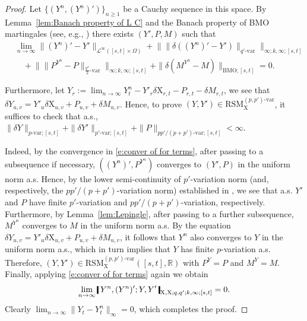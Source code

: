 \documentclass[11pt,reqno]{amsart}
\numberwithin{equation}{section}
\def\R{\mathbb R}
\newcommand{\shortthickbar}{%
  \vcenter{\hbox{\rule{1.8pt}{2.2ex}}}%
}
\newcommand{\thicknm}[1]{%
  \mathopen{\shortthickbar}%
  \mkern4mu #1 \mkern4mu%
  \mathclose{\shortthickbar}%
}
\begin{document}
\begin{proof}
Let $\{(Y^n,(Y^n)')\}_{n \ge 1}$ be a Cauchy sequence in this space. By Lemma~\ref{lem:Banach property of L C} and the Banach property of \textrm{BMO} martingales (see, e.g., \cite[Chapter~2.1]{Kazamaki1994}) there exists $(Y',P,M)$ such that 
\begin{equation}\label{e:conver of for terms}
\begin{aligned}
&\lim_{n\to\infty} \|(Y^n)' - Y'\|_{\mathcal L^{\infty}([s,t] \times \Omega)} + \big\| \|\delta ((Y^n)' - Y')\|_{q'\text{-}\mathrm{var}} \big\|_{\infty;k,\infty;[s,t]} \\
&\quad + \big\| \|P^{Y^n} - P\|_{\frac{q''}{2}\text{-}\mathrm{var}} \big\|_{\infty;k,\infty;[s,t]} + \|\delta(M^{Y^n} - M)\|_{\mathrm{BMO};[s,t]} = 0.
\end{aligned}
\end{equation}

Furthermore, let $Y_r := \lim_{n \to \infty} Y^n_{t} - Y'_r \delta \mathrm X_{r,t} - P_{r,t} - \delta M_{r,t}$, we see that $\delta Y_{u,v} = Y'_{u} \delta \mathrm X_{u,v} + P_{u,v} + \delta M_{u,v}$. Hence, to prove $(Y,Y') \in \mathrm{RSM}^{(p,p')\text{-}\mathrm{var}}_{\mathrm X}$, it suffices to check that a.s., $\|\delta Y\|_{p\text{-}\mathrm{var};[s,t]} + \|\delta Y'\|_{p'\text{-}\mathrm{var};[s,t]} + \|P\|_{pp'/(p+p')\text{-}\mathrm{var};[s,t]} < \infty$. 

Indeed, by the convergence in \eqref{e:conver of for terms}, after passing to a subsequence if necessary, $( (Y^{n})' , P^{Y^n} )$ converges to $(Y',P)$ in the uniform norm a.s. Hence, by the lower semi-continuity of $p'$-variation norm (and, respectively, the $pp'/(p+p')$-variation norm) established in \cite[Lemma~5.12]{friz2010multidimensional}, we see that a.s. $Y'$ and $P$ have finite $p'$-variation and $pp'/(p+p')$-variation, respectively. Furthermore, by Lemma~\ref{lem:Lepingle}, after passing to a further subsequence, $M^{Y^n}$ converges to $M$ in the uniform norm a.s. By the equation $\delta Y_{u,v} = Y'_{u} \delta \mathrm X_{u,v} + P_{u,v} + \delta M_{u,v}$, it follows that $Y^n$ also converges to $Y$ in the uniform norm a.s., which in turn implies that $Y$ has finite $p$-variation a.s. Therefore, $(Y,Y') \in \mathrm{RSM}^{(p,p')\text{-}\mathrm{var}}_{\mathrm X}([s,t],\R)$ with $P^Y = P$ and $M^Y = M$. Finally, applying \eqref{e:conver of for terms} again we obtain 
\begin{equation*}
\lim_{n \to \infty}\, \thicknm{Y^n,(Y^n)';Y,Y'}_{\mathrm X,\mathrm X;q,q';k,\infty;[s,t]} = 0. 
\end{equation*}
Clearly $\lim_{n \to \infty}\|Y_t - Y^n_t\|_{\infty} = 0$, which completes the proof.  
\end{proof}
\end{document}
